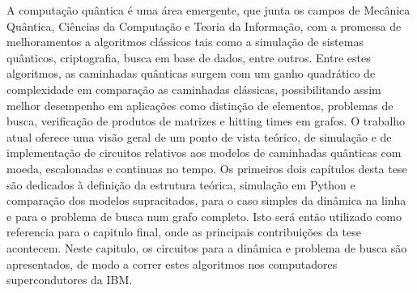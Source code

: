 \documentclass[../../dissertation.tex]{subfiles}
\begin{document}
A computação quântica é uma área emergente, que junta os campos de Mecânica
Quântica, Ciências da Computação e Teoria da Informação, com a promessa de
melhoramentos a algoritmos clássicos tais como a simulação de sistemas
quânticos, criptografia, busca em base de dados, entre outros. Entre estes
algoritmos, as caminhadas quânticas surgem com um ganho quadrático de
complexidade em comparação as caminhadas clássicas, possibilitando assim melhor
desempenho em aplicações como distinção de elementos, problemas de busca,
verificação de produtos de matrizes e hitting times em grafos. O trabalho atual
oferece uma visão geral de um ponto de vista teórico, de simulação e de
implementação de circuitos relativos aos modelos de caminhadas quânticas com
moeda, escalonadas e continuas no tempo. Os primeiros dois capítulos desta tese
são dedicados à definição da estrutura teórica, simulação em Python e
comparação dos modelos supracitados, para o caso simples da
dinâmica na linha e para o problema de busca num grafo completo. Isto será
então utilizado como referencia para o capitulo final, onde as principais
contribuições da tese acontecem. Neste capitulo, os circuitos para a dinâmica e
problema de busca são apresentados, de modo a correr estes algoritmos nos
computadores supercondutores da IBM. 
\end{document}
